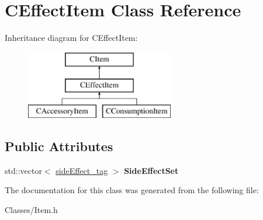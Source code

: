 \hypertarget{class_c_effect_item}{}\section{C\+Effect\+Item Class Reference}
\label{class_c_effect_item}
Inheritance diagram for C\+Effect\+Item\+:\begin{figure}[H]
\begin{center}
\leavevmode
\includegraphics[height=3.000000cm]{class_c_effect_item}
\end{center}
\end{figure}
\subsection*{Public Attributes}
\begin{DoxyCompactItemize}
\item 
std\+::vector$<$ \hyperlink{structside_effect__tag}{side\+Effect\+\_\+tag} $>$ {\bfseries Side\+Effect\+Set}\hypertarget{class_c_effect_item_a3adaa85fe5314200248c98347d5dcd6f}{}\label{class_c_effect_item_a3adaa85fe5314200248c98347d5dcd6f}

\end{DoxyCompactItemize}


The documentation for this class was generated from the following file\+:\begin{DoxyCompactItemize}
\item 
Classes/Item.\+h\end{DoxyCompactItemize}
